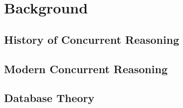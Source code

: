 \section{Background}

\subsection{History of Concurrent Reasoning}



\newpage

\subsection{Modern Concurrent Reasoning}



\newpage

\subsection{Database Theory}

